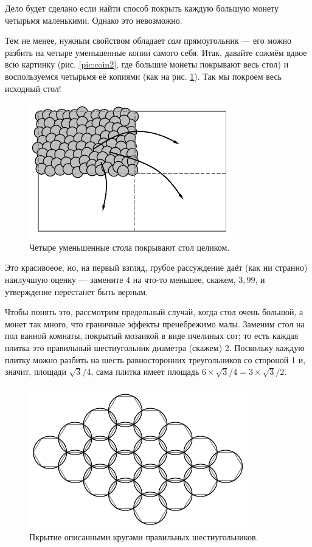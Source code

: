 Дело будет сделано если найти способ покрыть каждую большую монету четырьмя маленькими.
Однако это невозможно.

Тем не менее, нужным свойством обладает \emph{сам} прямоугольник --- его можно разбить на четыре уменьшенные копии самого себя.
Итак, давайте сожмём вдвое всю картинку (рис. \ref{pic:coin2}, где большие монеты покрывают весь стол) и воспользуемся четырьмя её копиями (как на рис. \ref{pic:coin3}).
Так мы покроем весь исходный стол!


\begin{figure}[t!]
\centering
\includegraphics[scale=1]{pics/coin3}
\caption{Четыре уменьшенные стола покрывают стол целиком.}
\label{pic:coin3}
\end{figure}

\medskip

Это красивоеое, но, на первый взгляд, грубое рассуждение даёт (как ни странно) наилучшую оценку --- замените $4$ на что-то меньшее, скажем, $3{,}99$, и утверждение перестанет быть верным.

Чтобы понять это, рассмотрим предельный случай, когда стол очень большой, а монет так много, что граничные эффекты пренебрежимо малы.
Заменим стол на пол ванной комнаты, покрытый мозаикой в виде пчелиных сот;
то есть каждая плитка это правильный шестиугольник диаметра (скажем) 2.
Поскольку каждую плитку можно разбить на шесть равносторонних треугольников со стороной 1 и, значит, площади $\sqrt{3}/4$, сама плитка имеет площадь $6\times\sqrt{3}/4=3\times\sqrt{3}/2$.

\begin{figure}[t!]
\centering
\includegraphics[scale=1]{pics/coin4}
\caption{Пкрытие описанными кругами правильных шестиугольников.}
\label{pic:coin4}
\end{figure}

